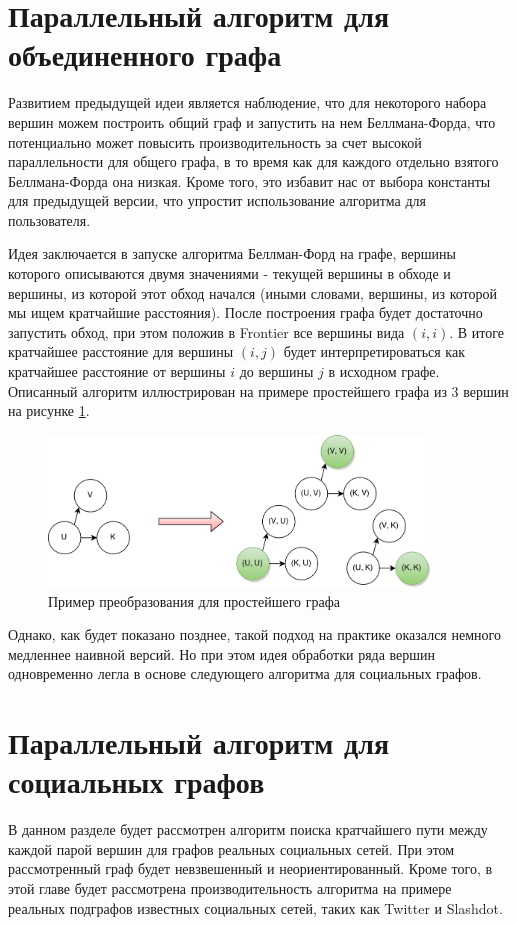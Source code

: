 \FloatBarrier
\section{Параллельный алгоритм для объединенного графа}
Развитием предыдущей идеи является наблюдение, что для некоторого набора вершин можем построить общий граф и запустить на нем Беллмана-Форда, что потенциально может повысить производительность за счет высокой параллельности для общего графа, в то время как для каждого отдельно взятого Беллмана-Форда она низкая. Кроме того, это избавит нас от выбора константы для предыдущей версии, что упростит использование алгоритма для пользователя. 

Идея заключается в запуске алгоритма Беллман-Форд на графе, вершины которого описываются двумя значениями - текущей вершины в обходе и вершины, из которой этот обход начался (иными словами, вершины, из которой мы ищем кратчайшие расстояния). После построения графа будет достаточно запустить обход, при этом положив в Frontier все вершины вида $(i, i)$. В итоге кратчайшее расстояние для вершины $(i, j)$ будет интерпретироваться как кратчайшее расстояние от вершины $i$ до вершины $j$ в исходном графе. Описанный алгоритм иллюстрирован на примере простейшего графа из 3 вершин на рисунке \ref{floyd_par_common_graph}. 
\FloatBarrier

\begin{figure}[h]
\caption{Пример преобразования для простейшего графа}
\label {floyd_par_common_graph}
\centering
\includegraphics[width=0.9\textwidth]{img/floyd_par_2.png}
\end{figure}
\FloatBarrier

Однако, как будет показано позднее, такой подход на практике оказался немного медленнее наивной версий. Но при этом идея обработки ряда вершин одновременно легла в основе следующего алгоритма для социальных графов. 
\FloatBarrier
\section{Параллельный алгоритм для социальных графов}
В данном разделе будет рассмотрен алгоритм поиска кратчайшего пути между каждой парой вершин для графов реальных социальных сетей. При этом рассмотренный граф будет невзвешенный и неориентированный. Кроме того, в этой главе будет рассмотрена производительность алгоритма на примере реальных подграфов известных социальных сетей, таких как Twitter и Slashdot\cite{STANFORDGRAPHS}.

